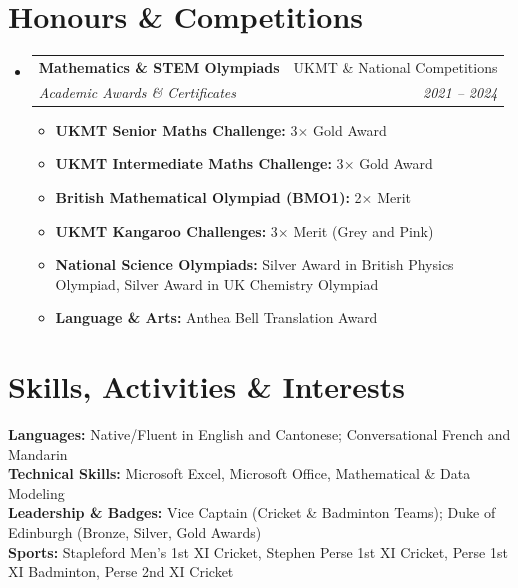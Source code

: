 \documentclass[letterpaper,11pt]{article}
\makeatletter
\newcommand{\resumeItem}[1]{
  \item\small{
    {#1 \vspace{-2pt}}
  }
}
\newcommand{\resumeSubheading}[4]{
  \vspace{-2pt}\item
    \begin{tabular*}{0.97\textwidth}[t]{l@{\extracolsep{\fill}}r}
      \textbf{#1} & #2 \\
      \textit{\small#3} & \textit{\small #4} \\
    \end{tabular*}\vspace{-7pt}
}
\newcommand{\resumeSubHeadingListStart}{\begin{itemize}[leftmargin=0.15in, label={}]}
\newcommand{\resumeSubHeadingListEnd}{\end{itemize}}
\newcommand{\resumeItemListStart}{\begin{itemize}}
\newcommand{\resumeItemListEnd}{\end{itemize}\vspace{-5pt}}
\makeatother
\begin{document}
\section{Honours \& Competitions}
  \resumeSubHeadingListStart
    \resumeSubheading
      {Mathematics \& STEM Olympiads}{UKMT \& National Competitions}
      {Academic Awards \& Certificates}{2021 -- 2024}
      \resumeItemListStart
        \resumeItem{\textbf{UKMT Senior Maths Challenge:} 3$\times$ Gold Award}
        \resumeItem{\textbf{UKMT Intermediate Maths Challenge:} 3$\times$ Gold Award}
        \resumeItem{\textbf{British Mathematical Olympiad (BMO1):} 2$\times$ Merit}
        \resumeItem{\textbf{UKMT Kangaroo Challenges:} 3$\times$ Merit (Grey and Pink)}
        \resumeItem{\textbf{National Science Olympiads:} Silver Award in British Physics Olympiad, Silver Award in UK Chemistry Olympiad}
        \resumeItem{\textbf{Language \& Arts:} Anthea Bell Translation Award}
      \resumeItemListEnd
  \resumeSubHeadingListEnd


\section{Skills, Activities \& Interests}
 \begin{itemize}[leftmargin=0.15in, label={}]
    \small{\item{
     \textbf{Languages:}{ Native/Fluent in English and Cantonese; Conversational French and Mandarin} \\
     \textbf{Technical Skills:}{ Microsoft Excel, Microsoft Office, Mathematical \& Data Modeling} \\
     \textbf{Leadership \& Badges:}{ Vice Captain (Cricket \& Badminton Teams); Duke of Edinburgh (Bronze, Silver, Gold Awards)} \\
     \textbf{Sports:}{ Stapleford Men's 1st XI Cricket, Stephen Perse 1st XI Cricket, Perse 1st XI Badminton, Perse 2nd XI Cricket}
    }}
 \end{itemize}


\end{document}
